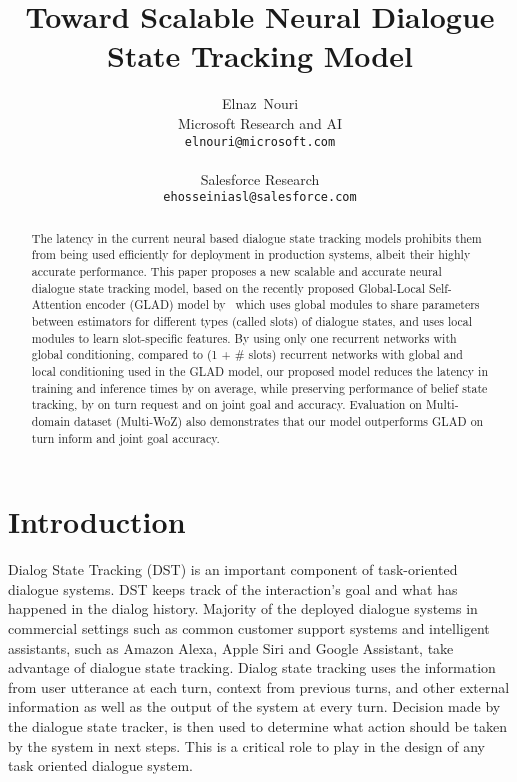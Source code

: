 \documentclass{article}
\title{Toward Scalable Neural Dialogue State Tracking Model}
\author{
Elnaz~Nouri\\
  Microsoft Research and AI\\
  \texttt{elnouri@microsoft.com} \\
  \And{Ehsan~Hosseini-Asl}\\
  Salesforce Research\\
  \texttt{ehosseiniasl@salesforce.com} 
}
\begin{document}
\maketitle

\begin{abstract}


The latency in the current neural based dialogue state tracking models prohibits them from being used efficiently for deployment in production systems, albeit their highly accurate performance. 
This paper proposes a new scalable and accurate neural dialogue state tracking model, based on the recently proposed Global-Local Self-Attention encoder (GLAD) model by~\cite{Zhong2018GlobalLocallySD} which uses global modules to share parameters between
estimators for different types (called slots) of dialogue states, and uses local modules to learn slot-specific features.
By using only one recurrent networks with global conditioning, compared to (1 + \# slots) recurrent networks with global and local conditioning used in the GLAD model, our proposed model reduces the latency in training and inference times by  on average, while preserving performance of belief state tracking, by  on turn request and  on joint goal and accuracy. Evaluation on Multi-domain dataset (Multi-WoZ) also demonstrates that our model outperforms GLAD on turn inform and joint goal accuracy. 

\end{abstract}

\maketitle

\section{Introduction}

Dialog State Tracking (DST) is an important component of task-oriented dialogue systems. DST keeps track of the interaction's goal and what has happened in the dialog history. Majority of the deployed dialogue systems in commercial settings such as common customer support systems and intelligent assistants, such as Amazon Alexa, Apple Siri and Google Assistant, take advantage of dialogue state tracking. Dialog state tracking uses the information from user utterance at each turn, context from previous turns, and other external information as well as the output of the system at every turn. 
Decision made by the dialogue state tracker, is then used to determine what action should be taken by the system in next steps. This is a critical role to play in the design of any task oriented dialogue system.  
\end{document}
